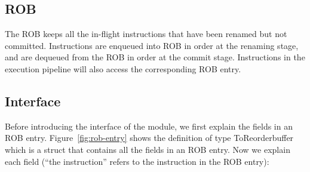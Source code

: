 \subsection{ROB}\label{sec:rob}

The ROB keeps all the in-flight instructions that have been renamed but not committed.
Instructions are enqueued into ROB in order at the renaming stage, and are dequeued from the ROB in order at the commit stage.
Instructions in the execution pipeline will also access the corresponding ROB entry.

\subsection{Interface}
Before introducing the interface of the module, we first explain the fields in an ROB entry.
Figure~\ref{fig:rob-entry} shows the definition of type ToReorderbuffer which is a struct that contains all the fields in an ROB entry.
Now we explain each field (``the instruction'' refers to the instruction in the ROB entry):
